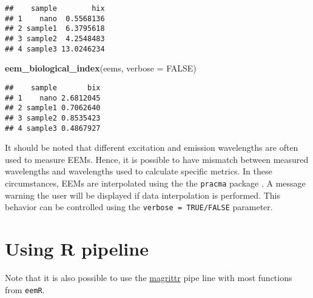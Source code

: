 \documentclass[]{book}
\newenvironment{Shaded}{\begin{snugshade}}{\end{snugshade}}
\newcommand{\KeywordTok}[1]{\textcolor[rgb]{0.13,0.29,0.53}{\textbf{{#1}}}}
\newcommand{\DataTypeTok}[1]{\textcolor[rgb]{0.13,0.29,0.53}{{#1}}}
\newcommand{\DecValTok}[1]{\textcolor[rgb]{0.00,0.00,0.81}{{#1}}}
\newcommand{\StringTok}[1]{\textcolor[rgb]{0.31,0.60,0.02}{{#1}}}
\newcommand{\OtherTok}[1]{\textcolor[rgb]{0.56,0.35,0.01}{{#1}}}
\newcommand{\NormalTok}[1]{{#1}}
\begin{document}
\begin{verbatim}
##    sample        hix
## 1    nano  0.5568136
## 2 sample1  6.3795618
## 3 sample2  4.2548483
## 4 sample3 13.0246234
\end{verbatim}

\begin{Shaded}
\begin{Highlighting}[]
\KeywordTok{eem_biological_index}\NormalTok{(eems, }\DataTypeTok{verbose =} \OtherTok{FALSE}\NormalTok{)}
\end{Highlighting}
\end{Shaded}

\begin{verbatim}
##    sample       bix
## 1    nano 2.6812045
## 2 sample1 0.7062640
## 3 sample2 0.8535423
## 4 sample3 0.4867927
\end{verbatim}

It should be noted that different excitation and emission wavelengths
are often used to measure EEMs. Hence, it is possible to have mismatch
between measured wavelengths and wavelengths used to calculate specific
metrics. In these circumstances, EEMs are interpolated using the the
\texttt{pracma} package \citep{Borchers2015}. A message warning the user
will be displayed if data interpolation is performed. This behavior can
be controlled using the \texttt{verbose\ =\ TRUE/FALSE} parameter.

\section{Using R pipeline}\label{using-r-pipeline}

Note that it is also possible to use the
\href{https://cran.r-project.org/web/packages/magrittr/vignettes/magrittr.html}{magrittr}
pipe line with most functions from \texttt{eemR}.

\begin{Shaded}
\end{Shaded}
\end{document}
